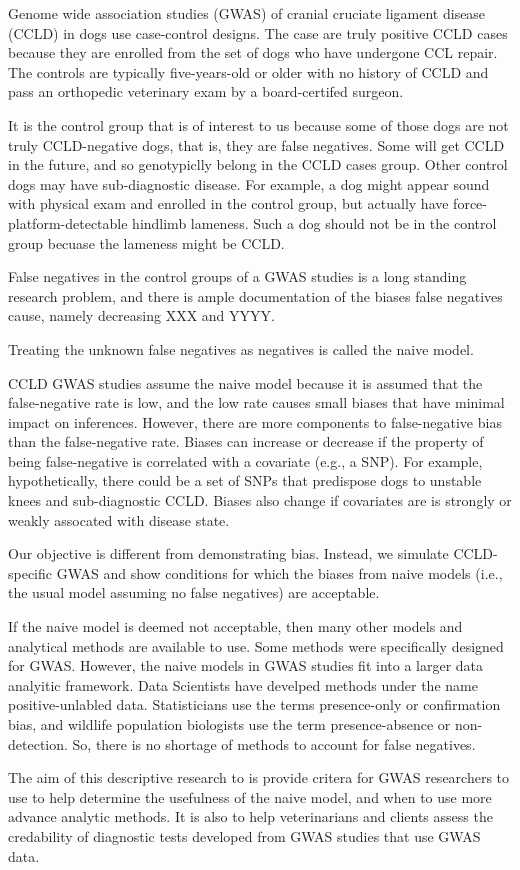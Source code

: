 

Genome wide association studies (GWAS) of cranial cruciate ligament disease (CCLD) in dogs use case-control designs. The case are truly positive CCLD cases because they are enrolled from the set of dogs who have undergone CCL repair. The controls are typically five-years-old or older with no history of CCLD and pass an orthopedic veterinary exam by a board-certifed surgeon. 

It is the control group that is of interest to us because some of those dogs are not truly CCLD-negative dogs, that is, they are false negatives. Some will get CCLD in the future, and so genotypiclly belong in the CCLD cases group. Other control dogs may have sub-diagnostic disease. For example, a dog might appear sound with physical exam and enrolled in the control group, but actually have force-platform-detectable hindlimb lameness. Such a dog should not be in the control group becuase the lameness might be CCLD. 

False negatives in the control groups of a GWAS studies is a long standing research problem, and there is ample documentation of the biases false negatives cause, namely decreasing XXX and YYYY. 

Treating the unknown false negatives as negatives is called the naive model. 

CCLD GWAS studies assume the naive model because it is assumed that the false-negative rate is low, and the low rate causes small biases that have minimal impact on inferences. However, there are more components to false-negative bias than the false-negative rate. Biases can increase or decrease if the property of being false-negative is correlated with a covariate (e.g., a SNP). For example, hypothetically, there could be a set of SNPs that predispose dogs to unstable knees and sub-diagnostic CCLD. Biases also change if covariates are is strongly or weakly assocated with disease state. 

Our objective is different from demonstrating bias. Instead, we simulate CCLD-specific GWAS and show conditions for which the biases from naive models (i.e., the usual model assuming no false negatives) are acceptable.

If the naive model is deemed not acceptable, then many other models and analytical methods are available to use. Some methods were specifically designed for GWAS. However, the naive models in GWAS studies fit into a larger data analyitic framework. Data Scientists have develped methods under the name positive-unlabled data. Statisticians use the terms presence-only or confirmation bias, and wildlife population biologists use the term presence-absence or non-detection. So, there is no shortage of methods to account for false negatives.

The aim of this descriptive research to is provide critera for GWAS researchers to use to help determine the usefulness of the naive model, and when to use more advance analytic methods. It is also to help veterinarians and clients assess the credability of diagnostic tests developed from GWAS studies that use GWAS data.


